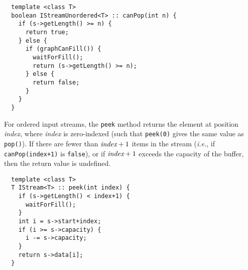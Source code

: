 {\small
\begin{verbatim}
  template <class T>
  boolean IStreamUnordered<T> :: canPop(int n) {
    if (s->getLength() >= n) {
      return true;
    } else {
      if (graphCanFill()) {
        waitForFill();
        return (s->getLength() >= n);
      } else {
        return false;
      }
    }
  }
\end{verbatim}}

 For ordered input streams, the {\tt peek} method returns
the element at position {\it index}, where {\it index} is zero-indexed
(such that {\tt peek(0)} gives the same value as {\tt pop()}).  If
there are fewer than $\mbox{\it index}+1$ items in the stream ({\it i.e.},
if {\tt canPop(index+1)} is {\tt false}), or if $\mbox{\it index}+1$ exceeds
the capacity of the buffer, then the return value is undefined.

{\small
\begin{verbatim}
  template <class T>
  T IStream<T> :: peek(int index) {
    if (s->getLength() < index+1) {
      waitForFill();
    }
    int i = s->start+index;
    if (i >= s->capacity) {
      i -= s->capacity;
    }
    return s->data[i];
  }
\end{verbatim}}








